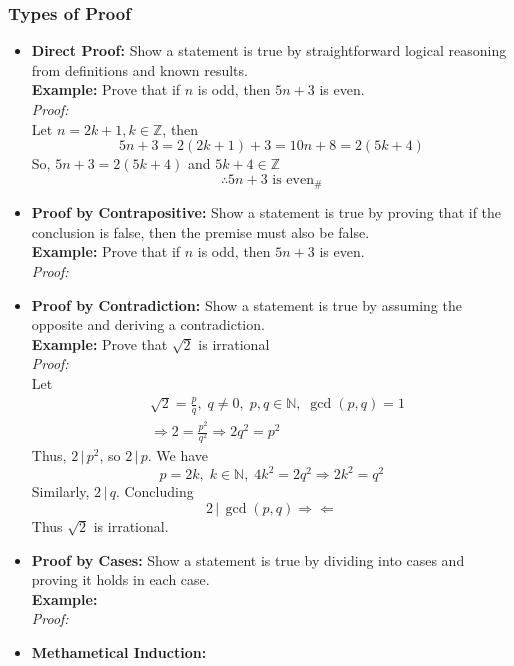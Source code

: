 \documentclass[11pt]{article}
\begin{document}
\subsubsection{Types of Proof}
\begin{itemize}
    \item\textbf{Direct Proof:}
        Show a statement is true by straightforward logical reasoning from definitions and known results.\\[.5em]
        \textbf{Example:} Prove that if $n$ is odd, then $5n+3$ is even.\\
        \textit{Proof:}\\
        Let $n = 2k + 1, k \in \mathbb{Z}$, then 
        \[
            5n+3 = 2(2k+1)+3=10n+8=2(5k+4)
        \]So, $5n+3=2(5k+4)$ and $5k+4\in\mathbb{Z}$\[\therefore 5n+3\text{ is even}_\#\]
    \item\textbf{Proof by Contrapositive:}
        Show a statement is true by proving that if the conclusion is false, then the premise must also be false.\\[.5em]
        \textbf{Example:} Prove that if $n$ is odd, then $5n+3$ is even.\\
        \textit{Proof:}
    \item\textbf{Proof by Contradiction:}
        Show a statement is true by assuming the opposite and deriving a contradiction.\\[.5em]
        \textbf{Example:} Prove that $\sqrt{2}$ is irrational\\
        \textit{Proof:}\\
        Let \begin{align*}
            &\sqrt{2} = \frac{p}{q},\;q\neq 0,\;p,q\in\mathbb{N},\;\gcd(p,q)=1\\
            &\Rightarrow 2 = \frac{p^2}{q^2} \Rightarrow 2q^2 = p^2
        \end{align*}
        Thus, $2\,|\,p^2$, so $2\,|\,p$. We have
        \[
            p=2k,\;k\in\mathbb{N}, \;4k^2 = 2q^2 \Rightarrow 2k^2 = q^2
        \]
        Similarly, $2\,|\,q$. Concluding 
        \[
            2\,|\,\gcd(p,q) \Rightarrow\!\Leftarrow
        \]
        Thus $\sqrt{2}$ is irrational. 
    \item\textbf{Proof by Cases:}
        Show a statement is true by dividing into cases and proving it holds in each case.\\[.5em]
        \textbf{Example:}\\
        \textit{Proof:}\\
    \item\textbf{Methametical Induction:}

\end{itemize}
\end{document}
